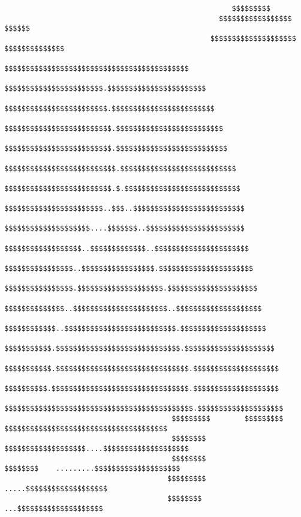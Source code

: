 \begin{verbatim}
                                                     $$$$$$$$$
                                                  $$$$$$$$$$$$$$$$$         $$$$$$
                                                $$$$$$$$$$$$$$$$$$$$    $$$$$$$$$$$$$$
                                              $$$$$$$$$$$$$$$$$$$$$$$$$$$$$$$$$$$$$$$$$$$
                                             $$$$$$$$$$$$$$$$$$$$$$$.$$$$$$$$$$$$$$$$$$$$$$$
                                            $$$$$$$$$$$$$$$$$$$$$$$$.$$$$$$$$$$$$$$$$$$$$$$$$
                                           $$$$$$$$$$$$$$$$$$$$$$$$$.$$$$$$$$$$$$$$$$$$$$$$$$$
                                           $$$$$$$$$$$$$$$$$$$$$$$$$.$$$$$$$$$$$$$$$$$$$$$$$$$$
                                          $$$$$$$$$$$$$$$$$$$$$$$$$$.$$$$$$$$$$$$$$$$$$$$$$$$$$$
                                          $$$$$$$$$$$$$$$$$$$$$$$$$.$.$$$$$$$$$$$$$$$$$$$$$$$$$$$
                                          $$$$$$$$$$$$$$$$$$$$$$$..$$$..$$$$$$$$$$$$$$$$$$$$$$$$$$
                                         $$$$$$$$$$$$$$$$$$$$....$$$$$$$..$$$$$$$$$$$$$$$$$$$$$$$
                                         $$$$$$$$$$$$$$$$$$..$$$$$$$$$$$$$..$$$$$$$$$$$$$$$$$$$$$$
                                         $$$$$$$$$$$$$$$$..$$$$$$$$$$$$$$$$$.$$$$$$$$$$$$$$$$$$$$$$
                                        $$$$$$$$$$$$$$$$.$$$$$$$$$$$$$$$$$$$$.$$$$$$$$$$$$$$$$$$$$$
                                        $$$$$$$$$$$$$$..$$$$$$$$$$$$$$$$$$$$$$..$$$$$$$$$$$$$$$$$$$$
                                        $$$$$$$$$$$$..$$$$$$$$$$$$$$$$$$$$$$$$$$.$$$$$$$$$$$$$$$$$$$$
                                        $$$$$$$$$$$.$$$$$$$$$$$$$$$$$$$$$$$$$$$$$.$$$$$$$$$$$$$$$$$$$$$
                                       $$$$$$$$$$$.$$$$$$$$$$$$$$$$$$$$$$$$$$$$$$$.$$$$$$$$$$$$$$$$$$$$
                                       $$$$$$$$$$.$$$$$$$$$$$$$$$$$$$$$$$$$$$$$$$$.$$$$$$$$$$$$$$$$$$$$
                                       $$$$$$$$$$$$$$$$$$$$$$$$$$$$$$$$$$$$$$$$$$$$.$$$$$$$$$$$$$$$$$$$$
                                       $$$$$$$$$        $$$$$$$$$ $$$$$$$$$$$$$$$$$$$$$$$$$$$$$$$$$$$$$$
                                       $$$$$$$$              $$$$$$$$$$$$$$$$$$$....$$$$$$$$$$$$$$$$$$$$
                                       $$$$$$$$                 $$$$$$$$    .........$$$$$$$$$$$$$$$$$$$$
                                      $$$$$$$$$                                  .....$$$$$$$$$$$$$$$$$$$
                                      $$$$$$$$                                     ...$$$$$$$$$$$$$$$$$$$$

\end{verbatim}
